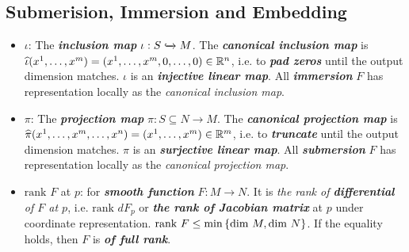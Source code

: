 \documentclass[11pt]{article}
\begin{document}
\subsection{Submerision, Immersion and Embedding}
\begin{itemize}
\item $\iota$: \quad The \textit{\textbf{inclusion map}} $\iota: S \xhookrightarrow{} M$. The \emph{\textbf{canonical inclusion map}} is $\widehat{\iota}(x^1, \ldots, x^m) = (x^1, \ldots, x^m, 0,\ldots, 0)\in {\mathbb R}^{n}$, i.e. to \emph{\textbf{pad zeros}} until the output dimension matches. $\iota$ is an \textbf{\emph{injective linear map}}.  All \emph{\textbf{immersion}} $F$ has representation locally as the \emph{canonical inclusion map}.

\item $\pi$: \quad The \textit{\textbf{projection map}} $\pi: S \subseteq N \rightarrow M$. The \emph{\textbf{canonical projection map}} is $\widehat{\pi}(x^1, \ldots, x^m, \ldots, x^n) = (x^1, \ldots, x^m)\in {\mathbb R}^{m}$, i.e. to \emph{\textbf{truncate}} until the output dimension matches. $\pi$ is an \textbf{\emph{surjective linear map}}.  All \emph{\textbf{submersion}} $F$ has representation locally as the \emph{canonical projection map}.

\item $\text{rank }F$ at $p$: \quad for \emph{\textbf{smooth function}} $F: M \rightarrow N$. It is \emph{the rank of \textbf{differential} of $F$ at $p$}, i.e. $\text{rank }dF_p$ or \emph{\textbf{the rank of Jacobian matrix}} at $p$ under coordinate representation. $\text{rank }F \le \min\left\{\text{dim }M, \text{dim }N\right\}$. If the equality holds, then $F$ is  \emph{\textbf{of full rank}}. 
\end{itemize}
\end{document}
